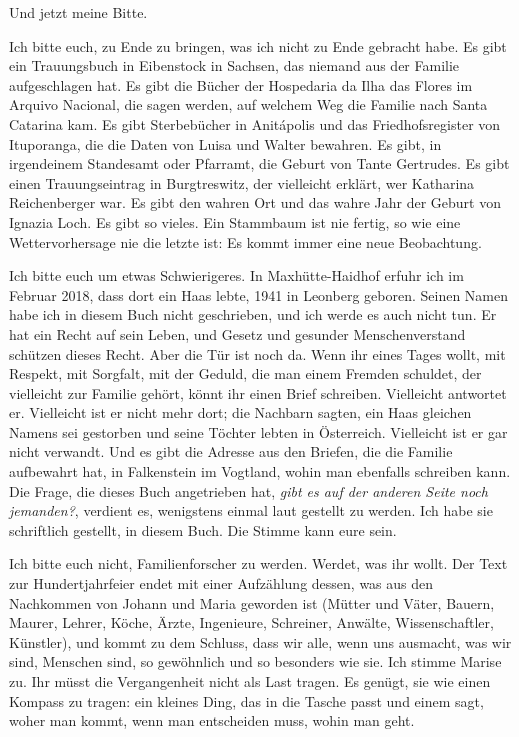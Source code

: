 \documentclass[
  ngerman,
  11pt,
  openany]{book}
\begin{document}
Und jetzt meine Bitte.

Ich bitte euch, zu Ende zu bringen, was ich nicht zu Ende gebracht habe.
Es gibt ein Trauungsbuch in Eibenstock in Sachsen, das niemand aus der
Familie aufgeschlagen hat. Es gibt die Bücher der Hospedaria da Ilha das
Flores im Arquivo Nacional, die sagen werden, auf welchem Weg die
Familie nach Santa Catarina kam. Es gibt Sterbebücher in Anitápolis und
das Friedhofsregister von Ituporanga, die die Daten von Luisa und Walter
bewahren. Es gibt, in irgendeinem Standesamt oder Pfarramt, die Geburt
von Tante Gertrudes. Es gibt einen Trauungseintrag in Burgtreswitz, der
vielleicht erklärt, wer Katharina Reichenberger war. Es gibt den wahren
Ort und das wahre Jahr der Geburt von Ignazia Loch. Es gibt so vieles.
Ein Stammbaum ist nie fertig, so wie eine Wettervorhersage nie die
letzte ist: Es kommt immer eine neue Beobachtung.

Ich bitte euch um etwas Schwierigeres. In Maxhütte-Haidhof erfuhr ich im
Februar 2018, dass dort ein Haas lebte, 1941 in Leonberg geboren. Seinen
Namen habe ich in diesem Buch nicht geschrieben, und ich werde es auch
nicht tun. Er hat ein Recht auf sein Leben, und Gesetz und gesunder
Menschenverstand schützen dieses Recht. Aber die Tür ist noch da. Wenn
ihr eines Tages wollt, mit Respekt, mit Sorgfalt, mit der Geduld, die
man einem Fremden schuldet, der vielleicht zur Familie gehört, könnt ihr
einen Brief schreiben. Vielleicht antwortet er. Vielleicht ist er nicht
mehr dort; die Nachbarn sagten, ein Haas gleichen Namens sei gestorben
und seine Töchter lebten in Österreich. Vielleicht ist er gar nicht
verwandt. Und es gibt die Adresse aus den Briefen, die die Familie
aufbewahrt hat, in Falkenstein im Vogtland, wohin man ebenfalls
schreiben kann. Die Frage, die dieses Buch angetrieben hat, \emph{gibt
es auf der anderen Seite noch jemanden?}, verdient es, wenigstens einmal
laut gestellt zu werden. Ich habe sie schriftlich gestellt, in diesem
Buch. Die Stimme kann eure sein.

Ich bitte euch nicht, Familienforscher zu werden. Werdet, was ihr wollt.
Der Text zur Hundertjahrfeier endet mit einer Aufzählung dessen, was aus
den Nachkommen von Johann und Maria geworden ist (Mütter und Väter,
Bauern, Maurer, Lehrer, Köche, Ärzte, Ingenieure, Schreiner, Anwälte,
Wissenschaftler, Künstler), und kommt zu dem Schluss, dass wir alle,
wenn uns ausmacht, was wir sind, Menschen sind, so gewöhnlich und so
besonders wie sie. Ich stimme Marise zu. Ihr müsst die Vergangenheit
nicht als Last tragen. Es genügt, sie wie einen Kompass zu tragen: ein
kleines Ding, das in die Tasche passt und einem sagt, woher man kommt,
wenn man entscheiden muss, wohin man geht.
\end{document}
